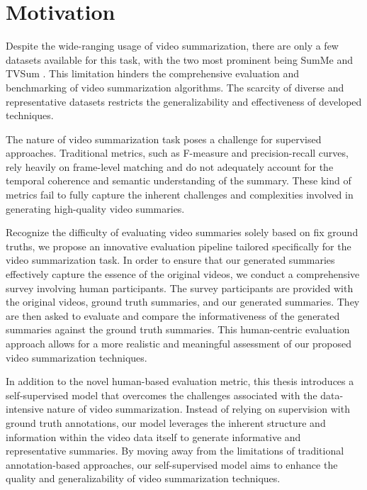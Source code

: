 \section{Motivation}
\label{section:intro-motivation}

Despite the wide-ranging usage of video summarization, there are only a few datasets available for this task, with the two most prominent being SumMe \cite{Gygli2014SumMe} and TVSum \cite{Song2015TVSum}. This limitation hinders the comprehensive evaluation and benchmarking of video summarization algorithms. The scarcity of diverse and representative datasets restricts the generalizability and effectiveness of developed techniques.

The nature of video summarization task poses a challenge for supervised approaches. Traditional metrics, such as F-measure and precision-recall curves, rely heavily on frame-level matching and do not adequately account for the temporal coherence and semantic understanding of the summary. These kind of metrics fail to fully capture the inherent challenges and complexities involved in generating high-quality video summaries.

Recognize the difficulty of evaluating video summaries solely based on fix ground truths, we propose an innovative evaluation pipeline tailored specifically for the video summarization task. In order to ensure that our generated summaries effectively capture the essence of the original videos, we conduct a comprehensive survey involving human participants. The survey participants are provided with the original videos, ground truth summaries, and our generated summaries. They are then asked to evaluate and compare the informativeness of the generated summaries against the ground truth summaries. This human-centric evaluation approach allows for a more realistic and meaningful assessment of our proposed video summarization techniques.

In addition to the novel human-based evaluation metric, this thesis introduces a self-supervised model that overcomes the challenges associated with the data-intensive nature of video summarization. Instead of relying on supervision with ground truth annotations, our model leverages the inherent structure and information within the video data itself to generate informative and representative summaries. By moving away from the limitations of traditional annotation-based approaches, our self-supervised model aims to enhance the quality and generalizability of video summarization techniques.